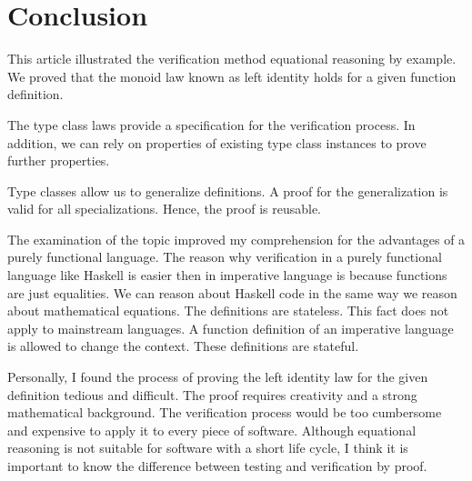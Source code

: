 
\section{Conclusion}

This article illustrated the verification method equational reasoning by example. We proved that the monoid law known as left identity holds for a given function definition. 

The type class laws provide a specification for the verification process. In addition, we can rely on properties of existing type class instances to prove further properties.

Type classes allow us to generalize definitions. A proof for the generalization is valid for all specializations. Hence, the proof is reusable.

The examination of the topic improved my comprehension for the advantages of a purely functional language. The reason why verification in a purely functional language like Haskell is easier then in imperative language is because functions are just equalities. We can reason about Haskell code in the same way we reason about mathematical equations. The definitions are stateless. This fact does not apply to mainstream languages. A function definition of an imperative language is allowed to change the context. These definitions are stateful.

Personally, I found the process of proving the left identity law for the given definition tedious and difficult. The proof requires creativity and a strong mathematical background. The verification process would be too cumbersome and expensive to apply it to every piece of software. Although equational reasoning  is not suitable for software with a short life cycle, I think it is important to know the difference between testing and verification by proof.
